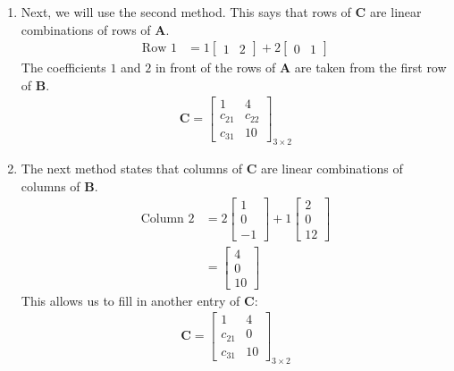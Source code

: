 \documentclass[11pt]{article}
\newcommand{\mat}[1]{\mathbf{#1}}
\begin{document}
\begin{enumerate}
{}
\item{
Next, we will use the second method. This says that rows of $\mat{C}$ are linear combinations of rows of $\mat{A}$.
\begin{align*}
\text{Row 1} &=
1 \begin{bmatrix}1 & 2\end{bmatrix} +
2 \begin{bmatrix}0 & 1\end{bmatrix}
\end{align*}
The coefficients $1$ and $2$ in front of the rows of $\mat{A}$ are taken from the first row of $\mat{B}$.
\begin{align*}
\mat{C} = \begin{bmatrix}1 & 4\\c_{21} & c_{22}\\c_{31} & 10\end{bmatrix}_{3 \times 2}
\end{align*}
}
\item{
The next method states that columns of $\mat{C}$ are linear combinations of columns of $\mat{B}$.
\begin{align*}
\text{Column 2} &=
2 \begin{bmatrix}1\\0\\-1\end{bmatrix} +
1 \begin{bmatrix}2\\0\\12\end{bmatrix}
\\
&= \begin{bmatrix}4\\0\\10\end{bmatrix}
\end{align*}
This allows us to fill in another entry of $\mat{C}$:
\begin{align*}
\mat{C} = \begin{bmatrix}1 & 4\\c_{21} & 0\\c_{31} & 10\end{bmatrix}_{3 \times 2}
\end{align*}
}
\end{enumerate}
\end{document}
